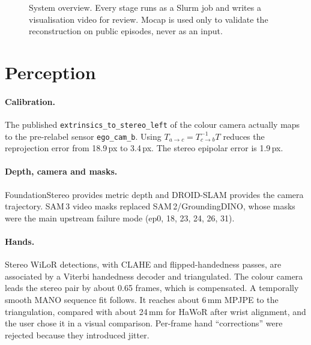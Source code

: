 \documentclass[10pt,a4paper]{article}
\begin{document}
\begin{figure}[h!]
{}
\caption{System overview. Every stage runs as a Slurm job and writes a visualisation video for review. Mocap is used only to validate the reconstruction on public episodes, never as an input.}
\label{fig:system}
\end{figure}

\section{Perception}
\paragraph{Calibration.} The published \texttt{extrinsics\_to\_stereo\_left} of the colour camera actually
maps to the pre-relabel sensor \texttt{ego\_cam\_b}. Using $T_{a\to c}=T_{c\to b}^{-1}T$ reduces the
reprojection error from 18.9\,px to 3.4\,px. The stereo epipolar error is 1.9\,px.

\paragraph{Depth, camera and masks.} FoundationStereo provides metric depth and DROID-SLAM provides the camera
trajectory. SAM\,3 video masks replaced SAM\,2/GroundingDINO, whose masks were the main upstream failure mode (ep0, 18, 23, 24, 26, 31).

\paragraph{Hands.} Stereo WiLoR detections, with CLAHE and flipped-handedness passes, are associated by a Viterbi
handedness decoder and triangulated. The colour camera leads the stereo pair by about 0.65 frames, which is compensated.
A temporally smooth MANO sequence fit follows. It reaches about 6\,mm MPJPE to the triangulation, compared with about 24\,mm for HaWoR after wrist
alignment, and the user chose it in a visual comparison. Per-frame hand ``corrections'' were rejected
because they introduced jitter.
\end{document}
